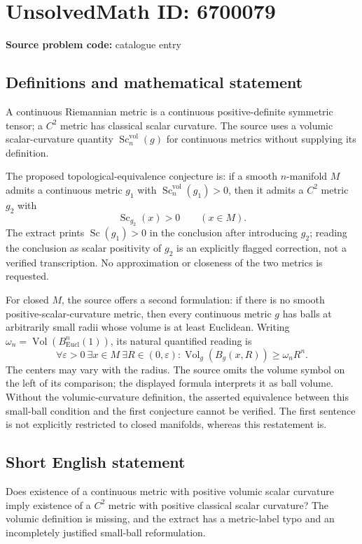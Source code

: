 \documentclass[11pt]{article}
\begin{document}
\section*{UnsolvedMath ID: 6700079}
\textbf{Source problem code:} catalogue entry
\subsection{Definitions and mathematical statement}
A continuous Riemannian metric is a continuous positive-definite symmetric tensor; a $C^2$ metric has classical scalar curvature. The source uses a volumic scalar-curvature quantity $\operatorname{Sc}^{\mathrm{vol}}_n(g)$ for continuous metrics without supplying its definition.

The proposed topological-equivalence conjecture is: if a smooth $n$-manifold $M$ admits a continuous metric $g_1$ with $\operatorname{Sc}^{\mathrm{vol}}_n(g_1)>0$, then it admits a $C^2$ metric $g_2$ with
\[
\operatorname{Sc}_{g_2}(x)>0\qquad(x\in M).
\]
The extract prints $\operatorname{Sc}(g_1)>0$ in the conclusion after introducing $g_2$; reading the conclusion as scalar positivity of $g_2$ is an explicitly flagged correction, not a verified transcription. No approximation or closeness of the two metrics is requested.

For closed $M$, the source offers a second formulation: if there is no smooth positive-scalar-curvature metric, then every continuous metric $g$ has balls at arbitrarily small radii whose volume is at least Euclidean. Writing $\omega_n=\operatorname{Vol}(B^n_{\mathrm{Eucl}}(1))$, its natural quantified reading is
\[
\forall\varepsilon>0\ \exists x\in M\ \exists R\in(0,\varepsilon):
\operatorname{Vol}_g(B_g(x,R))\geq\omega_n R^n.
\]
The centers may vary with the radius. The source omits the volume symbol on the left of its comparison; the displayed formula interprets it as ball volume. Without the volumic-curvature definition, the asserted equivalence between this small-ball condition and the first conjecture cannot be verified. The first sentence is not explicitly restricted to closed manifolds, whereas this restatement is.
\subsection{Short English statement}
Does existence of a continuous metric with positive volumic scalar curvature imply existence of a $C^2$ metric with positive classical scalar curvature? The volumic definition is missing, and the extract has a metric-label typo and an incompletely justified small-ball reformulation.
\end{document}
